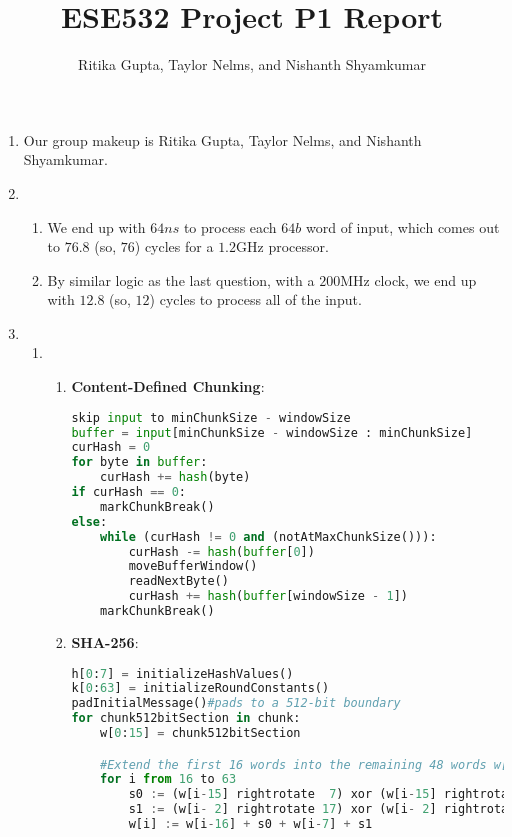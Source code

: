 \documentclass{article}
\title{ESE532 Project P1 Report}
\author{Ritika Gupta, Taylor Nelms, and Nishanth Shyamkumar}
\begin{document}
\maketitle


\begin{enumerate}
\item%
Our group makeup is Ritika Gupta, Taylor Nelms, and Nishanth Shyamkumar.

\item%
\begin{enumerate}[label=(\alph*)]
\item%
We end up with $64ns$ to process each $64b$ word of input, which comes out to $76.8$ (so, $76$) cycles for a $1.2$GHz processor.

\item%
By similar logic as the last question, with a $200$MHz clock, we end up with $12.8$ (so, $12$) cycles to process all of the input.

\end{enumerate}%

\item%
\begin{enumerate}[label=(\alph*)]
\item%
\begin{enumerate}[label=(\roman*)]
\item%
\textbf{Content-Defined Chunking}:\newline
\begin{lstlisting}[language=python]
skip input to minChunkSize - windowSize
buffer = input[minChunkSize - windowSize : minChunkSize]
curHash = 0
for byte in buffer:
    curHash += hash(byte)
if curHash == 0:
    markChunkBreak()
else:
    while (curHash != 0 and (notAtMaxChunkSize())):
        curHash -= hash(buffer[0])
        moveBufferWindow()
        readNextByte()
        curHash += hash(buffer[windowSize - 1])
    markChunkBreak()
\end{lstlisting}
\item%
\textbf{SHA-256}:
\begin{lstlisting}[language=python]
h[0:7] = initializeHashValues()
k[0:63] = initializeRoundConstants()
padInitialMessage()#pads to a 512-bit boundary
for chunk512bitSection in chunk:
    w[0:15] = chunk512bitSection

    #Extend the first 16 words into the remaining 48 words w[16..63] of the message schedule array:
    for i from 16 to 63
        s0 := (w[i-15] rightrotate  7) xor (w[i-15] rightrotate 18) xor (w[i-15] rightshift  3)
        s1 := (w[i- 2] rightrotate 17) xor (w[i- 2] rightrotate 19) xor (w[i- 2] rightshift 10)
        w[i] := w[i-16] + s0 + w[i-7] + s1
    

\end{lstlisting}
\end{enumerate}
\end{enumerate}
\end{enumerate}
\end{document}
